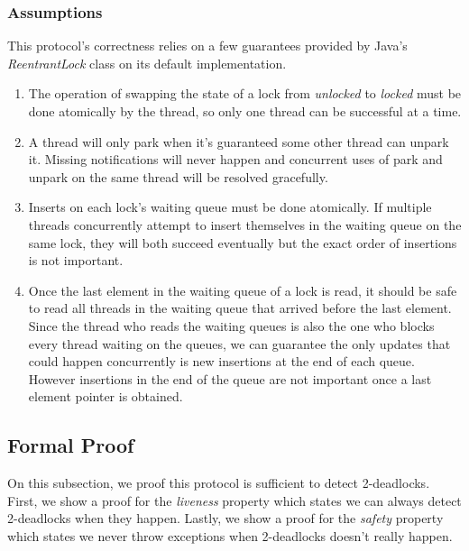 \subsubsection{Assumptions}
This protocol's correctness relies on a few guarantees provided by Java's \emph{ReentrantLock} class on its default implementation.
\begin{enumerate}
\item The operation of swapping the state of a lock from \emph{unlocked} to \emph{locked} must be done atomically by the thread, so only one thread can be successful at a time.
\item A thread will only park when it's guaranteed some other thread can unpark it. Missing notifications will never happen and concurrent uses of park and unpark on the same thread will be resolved gracefully.
\item Inserts on each lock's waiting queue must be done atomically. If multiple threads concurrently attempt to insert themselves in the waiting queue on the same lock, they will both succeed eventually but the exact order of insertions is not important.
\item Once the last element in the waiting queue of a lock is read, it should be safe to read all threads in the waiting queue that arrived before the last element. Since the thread who reads the waiting queues is also the one who blocks every thread waiting on the queues, we can guarantee the only updates that could happen concurrently is new insertions at the end of each queue. However insertions in the end of the queue are not important once a last element pointer is obtained.
\end{enumerate}

\subsection{Formal Proof}
On this subsection, we proof this protocol is sufficient to detect 2-deadlocks.
First, we show a proof for the \emph{liveness} property which states we can always detect 2-deadlocks when they happen.
Lastly, we show a proof for the \emph{safety} property which states we never throw exceptions when 2-deadlocks doesn't really happen.

